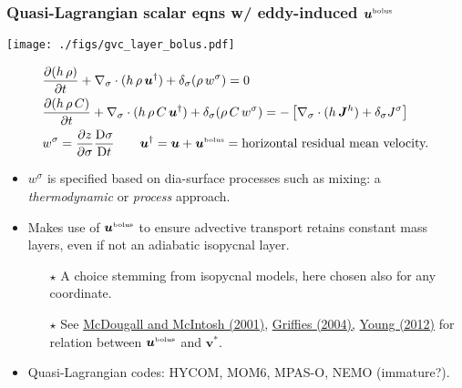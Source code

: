\documentclass[10pt]{beamer}
\begin{document}
\begin{frame}
  \frametitle{Quasi-Lagrangian scalar eqns w/ eddy-induced ${\bm u}^{\mbox{\tiny bolus}}$}

\begin{center}
\vspace{-.3cm}
{\texttt{[image: ./figs/gvc\_layer\_bolus.pdf]}}
\end{center}
\vspace{-.5cm}

\begin{align}
  &\frac{\partial (h \, \rho)}{\partial  t} + \nabla_{\sigma} \cdot (h \, \rho \, {\bm u}^{\dagger} ) 
 + \delta_{\sigma} (\rho \, w^{\sigma} ) 
 = 0 
 \\
  &\frac{\partial (h \, \rho \, C)}{\partial  t} + \nabla_{\sigma} \cdot (h \, \rho \, C \, {\bm u}^{\dagger} ) 
 + \delta_{\sigma} (\rho \, C \, w^{\sigma} ) 
 =
 -\left[  \nabla_{\sigma} \cdot ( h \, {\bm J}^{h}) +  \delta_{\sigma} J^{\sigma} \right] 
 \\
  &w^{\sigma} =  \frac{\partial z}{\partial \sigma}  \frac{ \mathrm{D} \sigma}{\mathrm{D}t} 
 \qquad {\bm u}^{\dagger}  = {\bm u} + {\bm u}^{\mbox{\tiny bolus}}  = \mbox{horizontal residual mean velocity.}
\label{eq:gvc-mass-tracer-equation}
\end{align}


\vspace{-.2cm} 
\begin{exampleblock}{}
\begin{itemize}

\item $w^{\sigma}$ is specified based on dia-surface processes such as
  mixing: a {\it thermodynamic} or {\it process} approach.

\item Makes use of ${\bm u}^{\mbox{\tiny bolus}}$ to ensure advective
  transport retains constant mass layers, even if not an adiabatic
  isopycnal layer. 
 \begin{itemize}
 \item[$\star$] \scriptsize A choice stemming from isopycnal models,
   here chosen also for any coordinate.
 \item[$\star$] See
   \href{https://doi.org/10.1175/1520-0485(2001)031<1222:TTRMVP>2.0.CO;2}{McDougall
     and McIntosh (2001)},
   \href{https://press.princeton.edu/titles/7797.html}{Griffies
     (2004),}
   \href{https://journals.ametsoc.org/doi/full/10.1175/JPO-D-11-0102.1}{Young
     (2012)} for relation between ${\bm u}^{\mbox{\tiny bolus}}$ and
   ${\bm v}^{*}$.
\end{itemize}

\item Quasi-Lagrangian codes: HYCOM, MOM6, MPAS-O, NEMO (immature?).


\end{itemize}
\end{exampleblock}{}

\end{frame}
\end{document}
